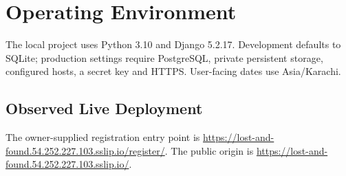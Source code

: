 \documentclass[12pt,a4paper,oneside]{report}
\begin{document}

\section{Operating Environment}

The local project uses Python 3.10 and Django 5.2.17. Development defaults to SQLite; production settings require PostgreSQL, private persistent storage, configured hosts, a secret key and HTTPS. User-facing dates use Asia/Karachi.


\subsection{Observed Live Deployment}

The owner-supplied registration entry point is \url{https://lost-and-found.54.252.227.103.sslip.io/register/}. The public origin is \url{https://lost-and-found.54.252.227.103.sslip.io/}.
\end{document}
